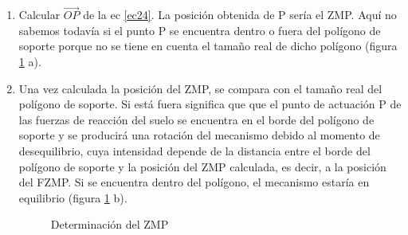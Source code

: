 \begin{enumerate}
\item Calcular $\overrightarrow{OP}$ de la ec \eqref{ec24}. La posición obtenida de P sería el ZMP. Aquí no sabemos todavía si el punto P se encuentra dentro o fuera del polígono de soporte porque no se tiene en cuenta el tamaño real de dicho polígono (figura \ref{figura223} a).

\item Una vez calculada la posición del ZMP, se compara con el tamaño real del polígono de soporte. Si está fuera significa que que el punto de actuación P de las fuerzas de reacción del suelo se encuentra en el borde del polígono de soporte y se producirá una rotación del mecanismo debido al momento de desequilibrio, cuya intensidad depende de la distancia entre el borde del polígono de soporte y la posición del ZMP calculada, es decir, a la posición del FZMP. Si se encuentra dentro del polígono, el mecanismo estaría en equilibrio (figura \ref{figura223} b).

\begin{figure}[H]
\centering
{}
\quad
{}
\caption{Determinación del ZMP}
\label{figura223}
\end{figure}

\end{enumerate}

